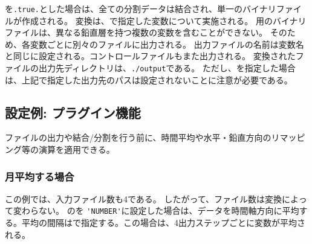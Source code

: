 を\verb|.true.|とした場合は、全ての分割データは結合され、単一のバイナリファイルが作成される。
変換は、で指定した変数について実施される。
\grads 用のバイナリファイルは、異なる鉛直層を持つ複数の変数を含むことができない。
そのため、各変数ごとに別々のファイルに出力される。
出力ファイルの名前は変数名と同じに設定される。コントロールファイルもまた出力される。
変換されたファイルの出力先ディレクトリは、\verb|./output|である。
ただし、を指定した場合は、上記で指定した出力先のパスは設定されないことに注意が必要である。




\subsection{設定例: プラグイン機能}

ファイルの出力や結合/分割を行う前に、時間平均や水平・鉛直方向のリマッピング等の演算を適用できる。

\subsubsection{月平均する場合}


この例では、入力ファイル数も4である。
したがって、ファイル数は変換によって変わらない。
 のを \verb|'NUMBER'|に設定した場合は、データを時間軸方向に平均する。平均の間隔はで指定する。この場合は、4出力ステップごとに変数が平均される。

